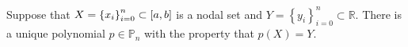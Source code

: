 \begin{frame}

    \begin{theorem}
        Suppose that
        \begin{math}
            X={\left\{x_{i}\right\}}_{i=0}^{n}\subset
            \left[a,b\right]
        \end{math}
        is a nodal set
        and
        \begin{math}
            Y=
            {\left\{
            y_{i}
            \right\}}_{i=0}^{n}\subset
            \mathbb{R}
        \end{math}.
        There is a unique polynomial $p\in\mathbb{P}_{n}$ with the
        property that $p\left(X\right)=Y$.
    \end{theorem}


\end{frame}
